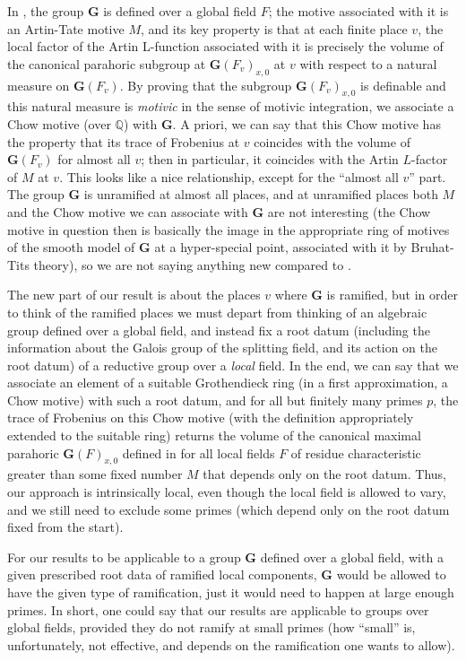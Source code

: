 \documentclass{amsart}
\newcommand{\Q}{{\mathbb Q}}
\newcommand{\bG}{\mathbf{G}}
\theoremstyle{plain}
\theoremstyle{definition}
\begin{document}
In \cite{gross:motive}, the group  $\bG$ is defined over a global field $F$; the motive associated with it is an Artin-Tate motive $M$, and its key property is that at each finite place $v$, the local factor of the Artin L-function  associated with it is precisely the volume of the canonical parahoric subgroup at 
$\bG(F_v)_{x, 0}$  at $v$ with respect to a natural measure on $\bG(F_v)$. 
By proving that the subgroup $\bG(F_v)_{x, 0}$  is definable and this natural measure is \emph{motivic} in the sense of motivic integration, we associate a Chow motive (over $\Q$) with $\bG$.
A priori, we can say that this Chow motive has the property that its trace of Frobenius at $v$ coincides with the volume of $\bG(F_v)$ for almost all $v$; then in particular, it coincides with the Artin $L$-factor of $M$ at $v$. This looks like a nice relationship, except for the ``almost all $v$'' part. 
The group $\bG$ is unramified at almost all places, and at unramified places both $M$ and the Chow motive we can associate with $\bG$ are not interesting (the Chow motive in question then is basically the image in the appropriate ring of motives of the smooth model of $\bG$ at a hyper-special point, associated with it by Bruhat-Tits theory), so we are not saying anything new compared to \cite{gross:motive}. 

The new part of our result is about the places $v$ where $\bG$ is ramified, but in order to think of the ramified places we must depart from thinking of an algebraic group defined over a global field, and instead fix a root datum (including the information about the Galois group of the splitting field, and its action on the root datum) of a reductive group over a \emph{local} field. In the end, we can say that we associate an element of a suitable Grothendieck ring (in a first approximation, a Chow motive) with such a root datum, and for all but finitely many primes $p$, the trace of Frobenius on this Chow motive (with the definition appropriately extended to the suitable ring) returns the volume of the canonical maximal parahoric $\bG(F)_{x, 0}$ defined in \cite{gross:motive} for all local fields $F$ of residue characteristic greater than some fixed number $M$ that depends only on the root datum. 
Thus, our approach is intrinsically local, even though the local field is allowed to vary, and we still need to exclude some primes (which depend only on the root datum fixed from the start). 

For our results to be applicable to a group $\bG$ defined over a global field, 
with a given  prescribed root data of ramified local components, 
$\bG$ would be allowed to have the given type of ramification, just  it would need to happen at large enough primes. In short, one could say that our results are applicable to groups over global fields, provided they do not ramify at small primes (how ``small'' is, unfortunately, not effective, and depends on the ramification one wants to allow). 
\end{document}
